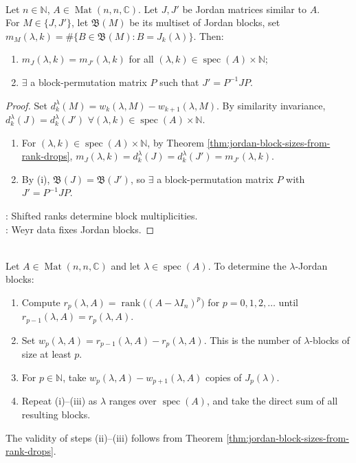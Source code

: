 \begin{corollary} \label{cor:jordan-form-unique-up-to-block-permutation} \\
Let $n\in\mathbb{N}$, $A\in\operatorname{Mat}(n,n,\mathbb{C})$. Let $J,J'$ be Jordan matrices similar to $A$.\\
For $M\in\{J,J'\}$, let $\mathfrak{B}(M)$ be its multiset of Jordan blocks, set $m_M(\lambda,k)=\#\{B\in\mathfrak{B}(M):B=J_k(\lambda)\}$. Then:
\begin{enumerate}[label=(\roman*)]
\setlength{\itemsep}{0pt}
\item $m_J(\lambda,k)=m_{J'}(\lambda,k)$ for all $(\lambda,k)\in\operatorname{spec}(A)\times\mathbb{N}$;
\item $\exists$ a block-permutation matrix $P$ such that $J'=P^{-1}JP$.
\end{enumerate}
\begin{proof}
Set $d_k^{\lambda}(M)=w_k(\lambda,M)-w_{k+1}(\lambda,M)$. By similarity invariance, $d_k^{\lambda}(J)=d_k^{\lambda}(J')$ $\forall (\lambda,k)\in\operatorname{spec}(A)\times\mathbb{N}$.
\begin{enumerate}[label=(\roman*)]
\setlength{\itemsep}{0pt}
\item For $(\lambda,k)\in\operatorname{spec}(A)\times\mathbb{N}$, by Theorem \ref{thm:jordan-block-sizes-from-rank-drops}, $m_J(\lambda,k)=d_k^{\lambda}(J)=d_k^{\lambda}(J')=m_{J'}(\lambda,k)$.
\item By (i), $\mathfrak{B}(J)=\mathfrak{B}(J')$, so $\exists$ a block-permutation matrix $P$ with $J'=P^{-1}JP$.
\end{enumerate}
: Shifted ranks determine block multiplicities.\\
: Weyr data fixes Jordan blocks.
\end{proof}
\end{corollary}

\begin{method} \label{meth:jordan-form-from-rank-drops} \\
Let $A\in\operatorname{Mat}(n,n,\mathbb{C})$ and let $\lambda\in\operatorname{spec}(A)$. To determine the $\lambda$-Jordan blocks:
\begin{enumerate}[label=(\roman*)]
\setlength{\itemsep}{0pt}
\item Compute $r_p(\lambda,A)=\operatorname{rank}\bigl((A-\lambda I_n)^p\bigr)$ for $p=0,1,2,\ldots$ until $r_{p-1}(\lambda,A)=r_p(\lambda,A)$.
\item Set $w_p(\lambda,A)=r_{p-1}(\lambda,A)-r_p(\lambda,A)$. This is the number of $\lambda$-blocks of size at least $p$.
\item For $p\in\mathbb{N}$, take $w_p(\lambda,A)-w_{p+1}(\lambda,A)$ copies of $J_p(\lambda)$.
\item Repeat (i)--(iii) as $\lambda$ ranges over $\operatorname{spec}(A)$, and take the direct sum of all resulting blocks.
\end{enumerate}
The validity of steps (ii)--(iii) follows from Theorem \ref{thm:jordan-block-sizes-from-rank-drops}.
\end{method}
